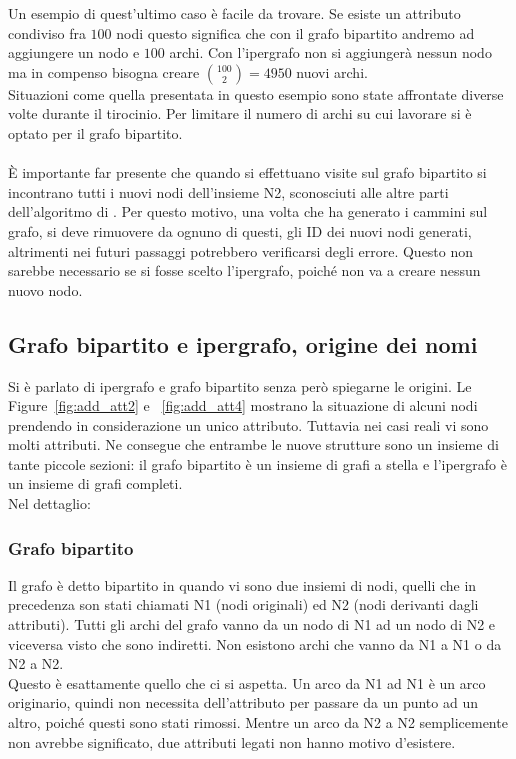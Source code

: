 Un esempio di quest'ultimo caso è facile da trovare. Se esiste un attributo condiviso fra $100$ nodi questo significa che con il grafo bipartito andremo ad aggiungere un nodo e $100$ archi. Con l'ipergrafo non si aggiungerà nessun nodo ma in compenso bisogna creare $ \binom{100}{2} = 4950$ nuovi archi.\\
Situazioni come quella presentata in questo esempio sono state affrontate diverse volte durante il tirocinio. Per limitare il numero di archi su cui lavorare si è optato per il grafo bipartito.\\
\\
È importante far presente che quando si effettuano visite sul grafo bipartito si incontrano tutti i nuovi nodi dell'insieme N2, sconosciuti alle altre parti dell'algoritmo di \cnrl. Per questo motivo, una volta che \nv ha generato i cammini sul grafo, si deve rimuovere da ognuno di questi, gli ID dei nuovi nodi generati, altrimenti nei futuri passaggi potrebbero verificarsi degli errore. Questo non sarebbe necessario se si fosse scelto l'ipergrafo, poiché non va a creare nessun nuovo nodo.
%
\subsection{Grafo bipartito e ipergrafo, origine dei nomi}
Si è parlato di ipergrafo e grafo bipartito senza però spiegarne le origini. Le Figure~\ref{fig:add_att2} e ~\ref{fig:add_att4} mostrano la situazione di alcuni nodi prendendo in considerazione un unico attributo. Tuttavia nei casi reali vi sono molti attributi. Ne consegue che entrambe le nuove strutture sono un insieme di tante piccole sezioni: il grafo bipartito è un insieme di grafi a stella e l'ipergrafo è un insieme di grafi completi.\\
Nel dettaglio:
%
\subsubsection*{Grafo bipartito}
Il grafo è detto bipartito in quando vi sono due insiemi di nodi, quelli che in precedenza son stati chiamati N1 (nodi originali) ed N2 (nodi derivanti dagli attributi). Tutti gli archi del grafo vanno da un nodo di N1 ad un nodo di N2 e viceversa visto che sono indiretti. Non esistono archi che vanno da N1 a N1 o da N2 a N2.\\
Questo è esattamente quello che ci si aspetta. Un arco da N1 ad N1 è un arco originario, quindi non necessita dell'attributo per passare da un punto ad un altro, poiché questi sono stati rimossi. Mentre un arco da N2 a N2 semplicemente non avrebbe significato, due attributi legati non hanno motivo d'esistere.
%
